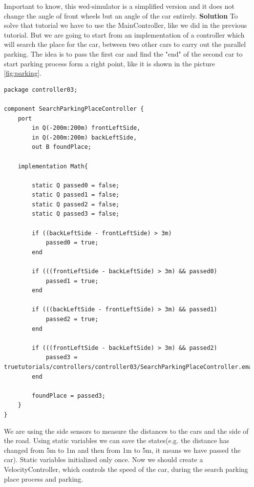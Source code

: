 Important to know, this wed-simulator is a simplified version and it does not change the angle of front wheels but an angle of the car entirely. \newline \newline
\textbf{Solution} \newline \newline
To solve that tutorial we have to use the MainController, like we did in the previous tutorial. But we are going to start from an implementation of a controller which will search the place for the car, between two other cars to carry out the parallel parking. The idea is to pass the first car and find the "end" of the second car to start parking process form a right point, like it is shown in the picture \ref{fig:parking}.
\bigskip
\begin{lstlisting}
package controller03;

component SearchParkingPlaceController {
    port
        in Q(-200m:200m) frontLeftSide,
        in Q(-200m:200m) backLeftSide,
        out B foundPlace;

    implementation Math{
        
        static Q passed0 = false;
        static Q passed1 = false;
        static Q passed2 = false;
        static Q passed3 = false;

        if ((backLeftSide - frontLeftSide) > 3m)
            passed0 = true;
        end

        if (((frontLeftSide - backLeftSide) > 3m) && passed0)
            passed1 = true;
        end
        
        if (((backLeftSide - frontLeftSide) > 3m) && passed1)
            passed2 = true;
        end
        
        if (((frontLeftSide - backLeftSide) > 3m) && passed2)
            passed3 = truetutorials/controllers/controller03/SearchParkingPlaceController.emam;
        end
        
        foundPlace = passed3;
    }
}    
\end{lstlisting}
\bigskip
We are using the side sensors to measure the distances to the cars and the side of the road. Using static variables we can save the states(e.g. the distance has changed from 5m to 1m and then from 1m to 5m, it means we have passed the car). Static variables initialized only once. Now we should create a VelocityController, which controls the speed of the car, during the search parking place process and parking.
\bigskip
